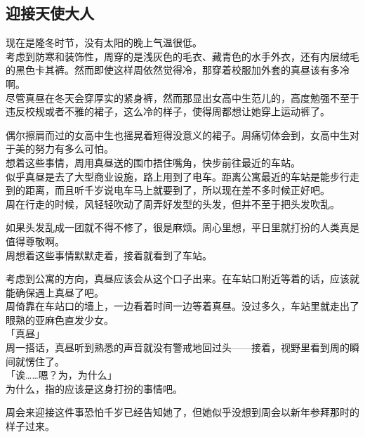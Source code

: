 \subsection{迎接天使大人}

现在是隆冬时节，没有太阳的晚上气温很低。\\

考虑到防寒和装饰性，周穿的是浅灰色的毛衣、藏青色的水手外衣，还有内层绒毛的黑色卡其裤。然而即使这样周依然觉得冷，那穿着校服加外套的真昼该有多冷啊。\\

尽管真昼在冬天会穿厚实的紧身裤，然而那显出女高中生范儿的，高度勉强不至于违反校规或者不雅的裙子，这么冷的样子，使得周都想让她穿上运动裤了。

偶尔擦肩而过的女高中生也摇晃着短得没意义的裙子。周痛切体会到，女高中生对于美的努力有多么可怕。\\

想着这些事情，周用真昼送的围巾捂住嘴角，快步前往最近的车站。\\

似乎真昼是去了大型商业设施，路上用到了电车。距离公寓最近的车站是能步行走到的距离，而且听千岁说电车马上就要到了，所以现在差不多时候正好吧。\\

周在行走的时候，风轻轻吹动了周弄好发型的头发，但并不至于把头发吹乱。

如果头发乱成一团就不得不修了，很是麻烦。周心里想，平日里就打扮的人类真是值得尊敬啊。\\

周想着这些事情默默走着，接着就看到了车站。

考虑到公寓的方向，真昼应该会从这个口子出来。在车站口附近等着的话，应该就能确保遇上真昼了吧。\\

周倚靠在车站口的墙上，一边看着时间一边等着真昼。没过多久，车站里就走出了眼熟的亚麻色直发少女。\\

「真昼」\\

周一搭话，真昼听到熟悉的声音就没有警戒地回过头——接着，视野里看到周的瞬间就愣住了。\\

「诶……嗯？为，为什么」\\

为什么，指的应该是这身打扮的事情吧。

周会来迎接这件事恐怕千岁已经告知她了，但她似乎没想到周会以新年参拜那时的样子过来。\\

